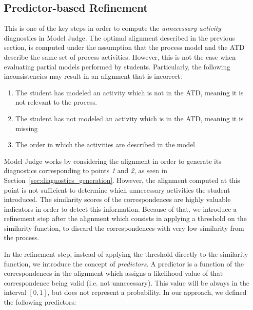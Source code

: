 \subsection{Predictor-based Refinement}
\label{sec:predictors}

This is one of the key steps in order to compute the \emph{unnecessary activity}
diagnostics in Model Judge. The optimal alignment described in the
previous section, is computed under the assumption that the process model and
the ATD describe the same set of process activities. However, this is not the
case when evaluating partial models performed by students. Particularly, the
following inconsistencies may result in an alignment that is incorrect:

\begin{enumerate}
  \item The student has modeled an activity which is not in the ATD, meaning it
    is not relevant to the process.
  \item The student has not modeled an activity which is in the ATD, meaning it
    is missing 
  \item The order in which the activities are described in the model 
\end{enumerate}

Model Judge works by considering the alignment in order to generate its
diagnostics corresponding to points \emph{1} and \emph{2}, as seen in
Section~\ref{sec:diagnostics_generation}. However, the alignment computed at
this point is not sufficient to determine which unnecessary activities the
student introduced. The similarity scores of the correspondences are highly
valuable indicators in order to detect this information. Because of that, we
introduce a refinement step after the alignment which consists in applying a
threshold on the similarity function, to discard the correspondences with very
low similarity from the process.

In the refinement step, instead of applying the threshold directly to the
similarity function, we introduce the concept of \emph{predictors}. A predictor
is a function of the correspondences in the alignment which assigns a likelihood
value of that correspondence being valid (i.e. not unnecessary). This value will
be always in the interval $[0,1]$, but does not represent a probability. In our
approach, we defined the following predictors:

